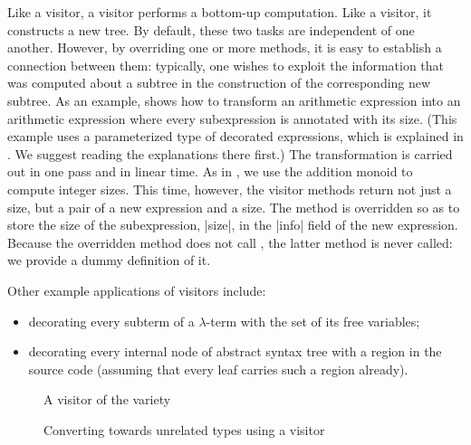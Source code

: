 \documentclass[11pt,a4paper,twoside]{article}
\begin{document}
Like a \reduce visitor, a \mapreduce visitor performs a bottom-up computation.
Like a \map visitor, it constructs a new tree. By default, these two tasks are
independent of one another. However, by overriding one or more methods, it is
easy to establish a connection between them: typically, one wishes to exploit
the information that was computed about a subtree in the construction of the
corresponding new subtree. As an example, 
shows how to transform an arithmetic expression into an arithmetic expression
where every subexpression is annotated with its size. (This example uses a
parameterized type of decorated expressions, which is explained in
. We suggest reading the explanations there
first.) The transformation is carried out in one pass and in linear time. As
in , we use the addition monoid to compute integer sizes.
This time, however, the visitor methods return not just a size, but a pair of
a new expression and a size. The method  is overridden so
as to store the size of the subexpression, \oc|size|, in the \oc|info| field
of the new expression. Because the overridden method  does
not call , the latter method is never called: we provide a
dummy definition of it.

Other example applications of \mapreduce visitors include:
\begin{itemize}[nosep]
\item decorating every subterm of a $\lambda$-term with the set of its free
  variables;
\item decorating every internal node of abstract syntax tree with a region in
  the source code (assuming that every leaf carries such a region already).
\end{itemize}


\begin{figure}[p]
\vspace{-\baselineskip}
\caption{A visitor of the \fold variety}
\label{fig:expr00fold}
\end{figure}

\begin{figure}[p]
\caption{Converting towards unrelated types using a \fold visitor}
\label{fig:fold}
\end{figure}
\end{document}
